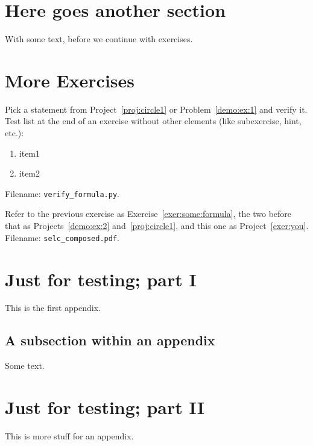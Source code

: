 \documentclass[%
oneside,                 %
final,                   %
10pt]{article}
\newenvironment{doconceexercise}{}{}
\newcounter{doconceexercisecounter}
\theoremstyle{definition}
\begin{document}
\begin{enumerate}
\section{Here goes another section}
With some text, before we continue with exercises.
\section{More Exercises}
\begin{doconceexercise}
                             
\label{exer:some:formula}
Pick a statement from Project~\vref{proj:circle1} or Problem~\vref{demo:ex:1}
and verify it.
Test list at the end of an exercise without other elements (like subexercise,
hint, etc.):
\begin{enumerate}
\item item1
\item item2
\end{enumerate}
\noindent
\noindent Filename: \Verb!verify_formula.py!.
\end{doconceexercise}
\begin{doconceexercise}
                             
\label{exer:you}
Refer to the previous exercise as Exercise~\vref{exer:some:formula},
the two before that as Projects~\vref{demo:ex:2} and~\vref{proj:circle1},
and this one as Project~\vref{exer:you}.
\noindent Filename: \Verb!selc_composed.pdf!.
\end{doconceexercise}


\appendix
\section{Just for testing; part I}
\label{app1}
This is the first appendix.
\subsection{A subsection within an appendix}
Some text.
\section{Just for testing; part II}
\label{app2}
This is more stuff for an appendix.

\end{enumerate}
\end{document}
